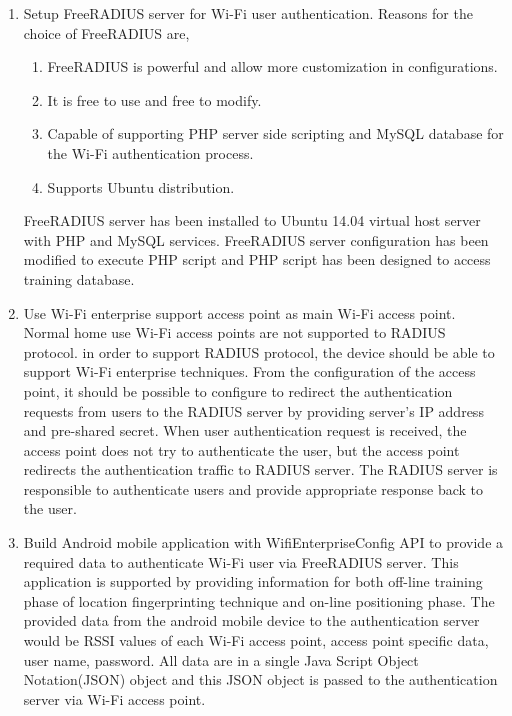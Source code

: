 	\begin{enumerate}
		\item Setup FreeRADIUS server for Wi-Fi user authentication.
		\subitem Reasons for the choice of FreeRADIUS are,
		
		\begin{enumerate}
			\item FreeRADIUS is powerful and allow more customization in configurations.
			\item It is free to use and free to modify.
			\item Capable of supporting PHP server side scripting and MySQL database for the Wi-Fi authentication process.
			\item Supports Ubuntu distribution.					
		\end{enumerate}
			\subitem FreeRADIUS server has been installed to Ubuntu 14.04 virtual host server with PHP and MySQL services. FreeRADIUS server configuration has been modified to execute PHP script and PHP script has been designed to access training database. 
		
		\item Use Wi-Fi enterprise support access point as main Wi-Fi access point. 
			\subitem Normal home use Wi-Fi access points are not supported to RADIUS protocol. in order to support RADIUS protocol, the device should be able to support Wi-Fi enterprise techniques. From the configuration of the access point, it should be possible to configure to redirect the authentication requests from users to the RADIUS server by providing server's IP address and pre-shared secret. When user authentication request is received, the access point does not try to authenticate the user, but the access point redirects the authentication traffic to RADIUS server. The RADIUS server is responsible to authenticate users and provide appropriate response back to the user.
	
		\item Build Android mobile application with WifiEnterpriseConfig API to provide a required data to authenticate Wi-Fi user via FreeRADIUS server. 	
			\subitem This application is supported by providing information for both off-line training phase of location fingerprinting technique and on-line positioning phase. The provided data from the android mobile device to the authentication server would be RSSI values of each Wi-Fi access point, access point specific data, user name, password. All data are in a single Java Script Object Notation(JSON) object and this JSON object is passed to the authentication server via Wi-Fi access point.
		

\end{enumerate}
